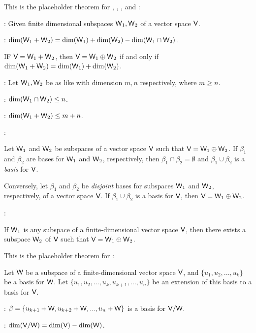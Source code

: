 \begin{additional theorem} \label{athm 1.27}
This is the placeholder theorem for , , , and :

: Given finite dimensional subspaces \(\textsf{W}_1, \textsf{W}_2\) of a vector space \(\textsf{V}\).

: \(\dim(\textsf{W}_1 + \textsf{W}_2) = \dim(\textsf{W}_1) + \dim(\textsf{W}_2) - \dim(\textsf{W}_1 \cap \textsf{W}_2)\).

 IF \(\textsf{V} = \textsf{W}_1 + \textsf{W}_2\), then \(\textsf{V} = \textsf{W}_1 \oplus \textsf{W}_2\) if and only if \(\dim(\textsf{W}_1 + \textsf{W}_2) = \dim(\textsf{W}_1) + \dim(\textsf{W}_2)\).

: Let \(\textsf{W}_1, \textsf{W}_2\) be as like  with dimension \(m, n\) respectively, where \(m \ge n\).

: \(\dim(\textsf{W}_1 \cap \textsf{W}_2) \le n\).

: \(\dim(\textsf{W}_1 + \textsf{W}_2) \le m + n\).

:

 Let \(\textsf{W}_1\) and \(\textsf{W}_2\) be subspaces of a vector space \(\textsf{V}\) such that \(\textsf{V} = \textsf{W}_1 \oplus \textsf{W}_2\).
If \(\beta_1\) and \(\beta_2\) are bases for \(\textsf{W}_1\) and \(\textsf{W}_2\), respectively, then \(\beta_1 \cap \beta_2 = \emptyset\) and \(\beta_1 \cup \beta_2\) is a \emph{basis} for \(\textsf{V}\).

 Conversely, let \(\beta_1\) and \(\beta_2\) be \emph{disjoint} bases for subspaces \(\textsf{W}_1\) and \(\textsf{W}_2\), respectively, of a vector space \(\textsf{V}\).
If \(\beta_1 \cup \beta_2\) is a basis for \(\textsf{V}\), then \(\textsf{V} = \textsf{W}_1 \oplus \textsf{W}_2\).
    
:

 If \(\textsf{W}_1\) is any subspace of a finite-dimensional vector space \(\textsf{V}\), then there exists a subspace \(\textsf{W}_2\) of \(\textsf{V}\) such that \(\textsf{V} = \textsf{W}_1 \oplus \textsf{W}_2\).
\end{additional theorem}

\begin{additional theorem} \label{athm 1.28}
This is the placeholder theorem for :

Let \(\textsf{W}\) be a subspace of a finite-dimensional vector space \(\textsf{V}\), and \(\{ u_1, u_2, ..., u_k \}\) be a basis for \(\textsf{W}\).
Let \(\{ u_1, u_2, ..., u_k, u_{k + 1}, ..., u_n \}\) be an extension of this basis to a basis for \(\textsf{V}\).

: \(\beta = \{ u_{k + 1} + \textsf{W}, u_{k + 2} + \textsf{W}, ..., u_n + \textsf{W} \}\) is a basis for \(\textsf{V} / \textsf{W}\).

: \(\dim(\textsf{V}/\textsf{W}) = \dim(\textsf{V}) - \dim(\textsf{W})\).
\end{additional theorem}